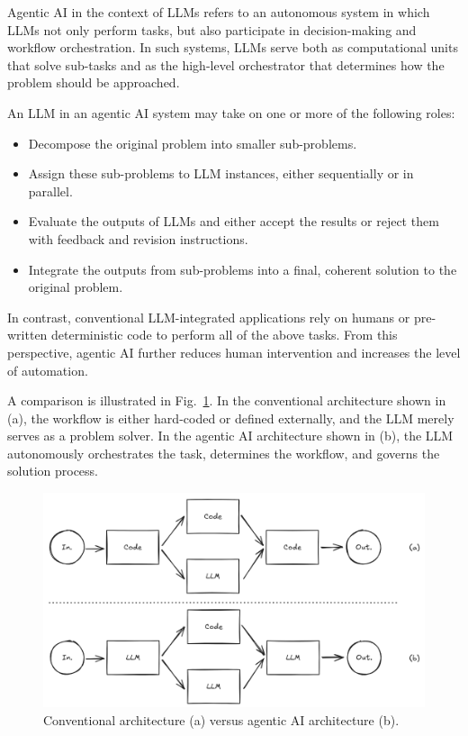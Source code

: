 Agentic AI in the context of LLMs refers to an autonomous system in which LLMs not only perform tasks, but also participate in decision-making and workflow orchestration. In such systems, LLMs serve both as computational units that solve sub-tasks and as the high-level orchestrator that determines how the problem should be approached.

An LLM in an agentic AI system may take on one or more of the following roles:
\begin{itemize}
	\item Decompose the original problem into smaller sub-problems.
	\item Assign these sub-problems to LLM instances, either sequentially or in parallel.
	\item Evaluate the outputs of LLMs and either accept the results or reject them with feedback and revision instructions.
	\item Integrate the outputs from sub-problems into a final, coherent solution to the original problem.
\end{itemize}

In contrast, conventional LLM-integrated applications rely on humans or pre-written deterministic code to perform all of the above tasks. From this perspective, agentic AI further reduces human intervention and increases the level of automation.

A comparison is illustrated in Fig.~\ref{fig:agenticwf1}. In the conventional architecture shown in (a), the workflow is either hard-coded or defined externally, and the LLM merely serves as a problem solver. In the agentic AI architecture shown in (b), the LLM autonomously orchestrates the task, determines the workflow, and governs the solution process.

\begin{figure}[!htb]
	\centering
	\includegraphics[width=\textwidth]{./chapters/part-7/figures/agenticaiworkflow.png}
	\caption{Conventional architecture (a) versus agentic AI architecture (b).}
	\label{fig:agenticwf1}
\end{figure}

